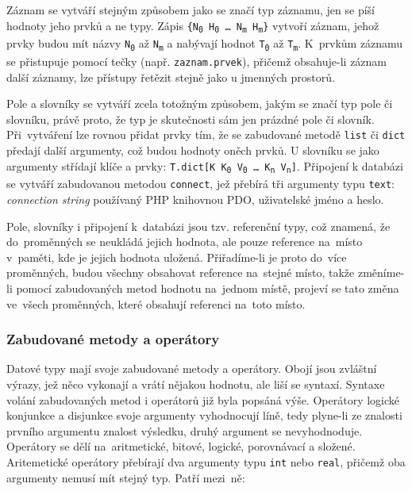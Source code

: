 \documentclass[a4paper,12pt]{article}
\begin{document}
Záznam se vytváří stejným způsobem jako se značí typ záznamu, jen se píší hodnoty jeho prvků a ne typy. Zápis \texttt{\{N\textsubscript{0} H\textsubscript{0} \ldots{} N\textsubscript{m} H\textsubscript{m}\}} vytvoří záznam, jehož prvky budou mít názvy \texttt{N\textsubscript{0}} až \texttt{N\textsubscript{m}} a nabývají hodnot \texttt{T\textsubscript{0}} až \texttt{T\textsubscript{m}}. K~prvkům záznamu se přistupuje pomocí tečky (např. \texttt{zaznam.prvek}), přičemž obsahuje-li záznam další záznamy, lze přístupy řetězit stejně jako u jmenných prostorů.

Pole a slovníky se vytváří zcela totožným způsobem, jakým se značí typ pole či slovníku, právě proto, že typ je skutečnosti sám jen prázdné pole či slovník. Při~vytváření lze rovnou přidat prvky tím, že se zabudované metodě \texttt{list} či \texttt{dict} předají další argumenty, což budou hodnoty oněch prvků. U slovníku se jako argumenty střídají klíče a prvky: \texttt{T.dict[K K\textsubscript{0} V\textsubscript{0} \ldots{} K\textsubscript{n} V\textsubscript{n}]}. Připojení k databázi se vytváří zabudovanou metodou \texttt{connect}, jež přebírá tři argumenty typu \texttt{text}: \textit{connection string} používaný PHP knihovnou PDO, uživatelské jméno a heslo.

Pole, slovníky i připojení k~databázi jsou tzv. referenční typy, což znamená, že do~proměnných se neukládá jejich hodnota, ale pouze reference na~místo v~paměti, kde je jejich hodnota uložená. Přiřadíme-li je proto do~více proměnných, budou všechny obsahovat reference na~stejné místo, takže změníme-li pomocí zabudovaných metod hodnotu na~jednom místě, projeví se tato změna ve~všech proměnných, které obsahují referenci na~toto místo.

\subsubsection{Zabudované metody a operátory}
Datové typy mají svoje zabudované metody a operátory. Obojí jsou zvláštní výrazy, jež něco vykonají a vrátí nějakou hodnotu, ale liší se syntaxí. Syntaxe volání zabudovaných metod i operátorů již byla popsáná výše. Operátory logické konjunkce a disjunkce svoje argumenty vyhodnocují líně, tedy plyne-li ze znalosti prvního argumentu znalost výsledku, druhý argument se nevyhodnoduje. Operátory se dělí na~aritmetické, bitové, logické, porovnávací a složené. Aritemetické operátory přebírají dva argumenty typu \texttt{int} nebo \texttt{real}, přičemž oba argumenty nemusí mít stejný typ. Patří mezi~ně:
\end{document}
